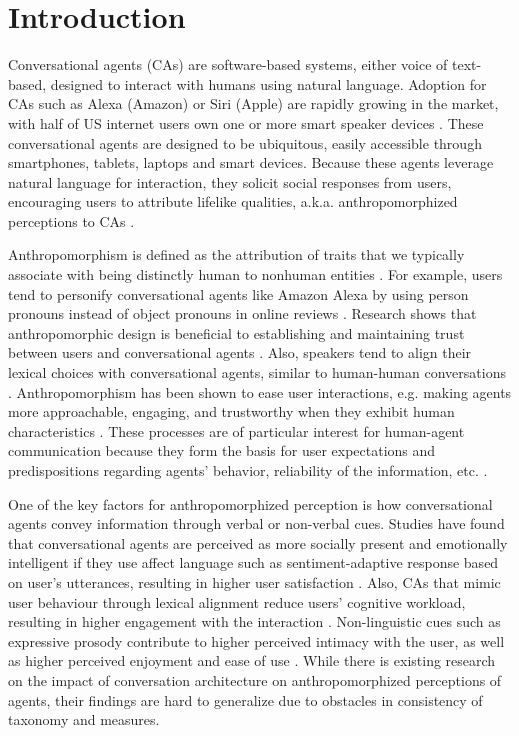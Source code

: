 \documentclass[sigconf,screen,review, anonymous]{acmart}
\begin{document}
\section{Introduction}

Conversational agents (CAs) are software-based systems, either voice of text-based, designed to interact with humans using natural language. Adoption for CAs such as Alexa (Amazon) or Siri (Apple) are rapidly growing in the market, with half of US internet users own one or more smart speaker devices \cite{2022comscore}. These conversational agents are designed to be ubiquitous, easily accessible through smartphones, tablets, laptops and smart devices. Because these agents leverage natural language for interaction, they solicit social responses from users, encouraging users to attribute lifelike qualities, a.k.a. anthropomorphized perceptions to CAs \cite{eyssel2012if}.

Anthropomorphism is defined as the attribution of traits that we typically associate with being distinctly human to nonhuman entities \cite{waytz2010sees}. For example, users tend to personify conversational agents like Amazon Alexa by using person pronouns instead of object pronouns in online reviews \cite{purington2017alexa}.  Research shows that anthropomorphic design is beneficial to establishing and maintaining trust between users and conversational agents \cite{seeger2021chatbots}. Also, speakers tend to align their lexical choices with conversational agents, similar to human-human conversations \cite{cowan2015does}. Anthropomorphism has been shown to ease user interactions, e.g. making agents more approachable, engaging, and trustworthy when they exhibit human characteristics \cite{qiu2009evaluating}. These processes are of particular interest for human-agent communication because they form the basis for user expectations and predispositions regarding agents' behavior, reliability of the information, etc. \cite{kuzminykh2020genie}.

One of the key factors for anthropomorphized perception is how conversational agents convey information through verbal or non-verbal cues. Studies have found that conversational agents are perceived as more socially present and emotionally intelligent if they use affect language such as sentiment-adaptive response based on user's utterances, resulting in higher user satisfaction \cite{diederich2019emulating}\cite{yang2017perceived}. Also, CAs that mimic user behaviour through lexical alignment reduce users' cognitive workload, resulting in higher engagement with the interaction \cite{spillner2021talk}. Non-linguistic cues such as expressive prosody contribute to higher perceived intimacy with the user, as well as higher perceived enjoyment and ease of use \cite{kim2020can}. While there is existing research on the impact of conversation architecture on anthropomorphized perceptions of agents, their findings are hard to generalize due to obstacles in consistency of taxonomy and measures.
\end{document}
